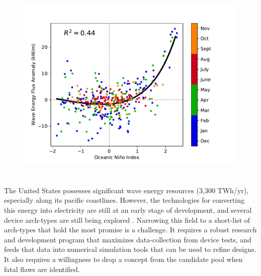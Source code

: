 \DIFaddbegin \begin{figure}[ht]
  \centering
  \includegraphics[width=\textwidth]{../fig/ENSO-Comparison.wc.pdf}
  \caption{}
  \label{fig:wc-nino}
\end{figure}

\section{}

\DIFaddend The United States possesses significant wave energy resources (3,300 TWh/yr), especially along its pacific coastlines. However, the technologies for converting this energy into electricity are still at an early stage of development, and several device arch-types are still being explored \cite{babaritOceanWaveEnergy2017}. Narrowing this field to a short-list of arch-types that hold the most promise is a challenge. It requires a robust research and development program that maximizes data-collection from device tests, and feeds that data into numerical simulation tools that can be used to refine designs. It also requires a willingness to drop a concept from the candidate pool when fatal flaws are identified.

